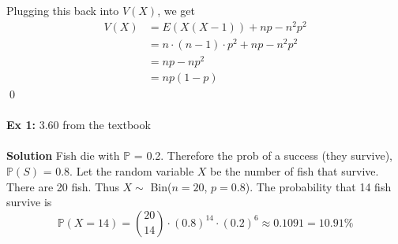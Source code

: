 \documentclass{article}
\newcommand{\bbP}{\mathbb{P}}
\begin{document}
Plugging this back into $V(X)$, we get
\begin{align*}
	V(X) &= E(X(X-1))+np-n^{2}p^{2}\\
		&= n\cdot(n-1)\cdot p^{2} + np - n^{2}p^{2}\\
		&= np -np^{2}\\
		&= np(1-p)
\end{align*}
\qed\\\\
\textbf{Ex 1:} 3.60 from the textbook\\\\
\textbf{Solution} Fish die with $\bbP$ = 0.2. Therefore the prob of a success (they survive), $\bbP(S)$ = 0.8. Let the random variable $X$ be the number of fish that survive. There are 20 fish. Thus $X \sim$ Bin($n=20$, $p=0.8$). The probability that 14 fish survive is
\[\bbP(X=14) = {20\choose 14}\cdot (0.8)^{14}\cdot(0.2)^{6} \approx 0.1091 = 10.91\%\]
\end{document}
